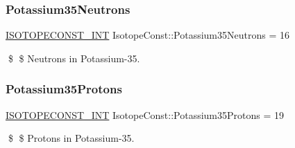 \subsubsection{\texorpdfstring{Potassium35\+Neutrons}{Potassium35Neutrons}}
{\footnotesize\ttfamily \mbox{\hyperlink{group___isotope_const-_macros_ga5f18360b3e99483a35c32d789e62621c}{I\+S\+O\+T\+O\+P\+E\+C\+O\+N\+S\+T\+\_\+\+I\+NT}} Isotope\+Const\+::\+Potassium35\+Neutrons = 16}

\$ \$ Neutrons in Potassium-\/35. \mbox{\label{group___isotope_const-_potassium-_k35_gad5371e2d5e8bd27e40b950cf99f3da94}} 
\subsubsection{\texorpdfstring{Potassium35\+Protons}{Potassium35Protons}}
{\footnotesize\ttfamily \mbox{\hyperlink{group___isotope_const-_macros_ga5f18360b3e99483a35c32d789e62621c}{I\+S\+O\+T\+O\+P\+E\+C\+O\+N\+S\+T\+\_\+\+I\+NT}} Isotope\+Const\+::\+Potassium35\+Protons = 19}

\$ \$ Protons in Potassium-\/35. 